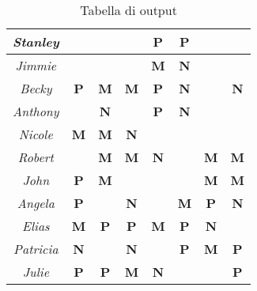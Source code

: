 \begin{table}[]
{\begin{tabular}{|c|c|c|c|c|c|c|c|}
\textit{Stanley} &  &  &  & {\color[HTML]{009901} \textbf{P}} & {\color[HTML]{009901} \textbf{P}} &  &  \\ \hline
\textit{Jimmie} &  &  &  & {\color[HTML]{CB0000} \textbf{M}} & {\color[HTML]{3531FF} \textbf{N}} &  &  \\ \hline
\textit{Becky} & {\color[HTML]{009901} \textbf{P}} & {\color[HTML]{CB0000} \textbf{M}} & {\color[HTML]{CB0000} \textbf{M}} & {\color[HTML]{009901} \textbf{P}} & {\color[HTML]{3531FF} \textbf{N}} &  & {\color[HTML]{3531FF} \textbf{N}} \\ \hline
\textit{Anthony} &  & {\color[HTML]{3531FF} \textbf{N}} &  & {\color[HTML]{009901} \textbf{P}} & {\color[HTML]{3531FF} \textbf{N}} &  &  \\ \hline
\textit{Nicole} & {\color[HTML]{CB0000} \textbf{M}} & {\color[HTML]{CB0000} \textbf{M}} & {\color[HTML]{3531FF} \textbf{N}} &  &  &  &  \\ \hline
\textit{Robert} &  & {\color[HTML]{CB0000} \textbf{M}} & {\color[HTML]{CB0000} \textbf{M}} & {\color[HTML]{3531FF} \textbf{N}} &  & {\color[HTML]{CB0000} \textbf{M}} & {\color[HTML]{CB0000} \textbf{M}} \\ \hline
\textit{John} & {\color[HTML]{009901} \textbf{P}} & {\color[HTML]{CB0000} \textbf{M}} &  &  &  & {\color[HTML]{CB0000} \textbf{M}} & {\color[HTML]{CB0000} \textbf{M}} \\ \hline
\textit{Angela} & {\color[HTML]{009901} \textbf{P}} &  & {\color[HTML]{3531FF} \textbf{N}} &  & {\color[HTML]{CB0000} \textbf{M}} & {\color[HTML]{009901} \textbf{P}} & {\color[HTML]{3531FF} \textbf{N}} \\ \hline
\textit{Elias} & {\color[HTML]{CB0000} \textbf{M}} & {\color[HTML]{009901} \textbf{P}} & {\color[HTML]{009901} \textbf{P}} & {\color[HTML]{CB0000} \textbf{M}} & {\color[HTML]{009901} \textbf{P}} & {\color[HTML]{3531FF} \textbf{N}} &  \\ \hline
\textit{Patricia} & {\color[HTML]{3531FF} \textbf{N}} &  & {\color[HTML]{3531FF} \textbf{N}} &  & {\color[HTML]{009901} \textbf{P}} & {\color[HTML]{CB0000} \textbf{M}} & {\color[HTML]{009901} \textbf{P}} \\ \hline
\textit{Julie} & {\color[HTML]{009901} \textbf{P}} & {\color[HTML]{009901} \textbf{P}} & {\color[HTML]{CB0000} \textbf{M}} & {\color[HTML]{3531FF} \textbf{N}} &  &  & {\color[HTML]{009901} \textbf{P}} \\ \hline
\end{tabular}%
}
\caption{Tabella di output}
\label{tab:TabellaOutput}
\end{table}





